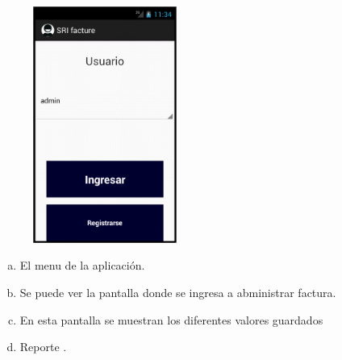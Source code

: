 \begin{figure}[ht!]
{        \includegraphics[width=0.42\textwidth]{./imagenes3/img8.png}}
    \hspace{0.1\linewidth}
\end{figure}

\begin{enumerate}[a)]
       \item El menu de la aplicación.
    \item Se puede ver la pantalla donde se ingresa a abministrar factura.
       \item  En esta pantalla se muestran los diferentes valores guardados 
     \item Reporte .   
\end{enumerate}

